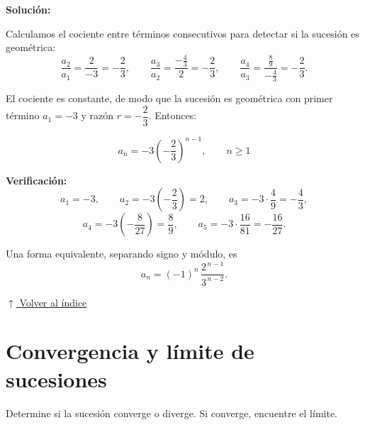 \documentclass[12pt]{article}
\newcommand{\solucion}{%
    \vspace{0.8em}%
    \textbf{Solución:}%
}
\newcommand{\volverindice}{%
    \vspace{1em}%
    \begin{flushright}%
        \hyperlink{indice}{\small $\uparrow$ Volver al índice}%
    \end{flushright}%
}
\begin{document}
\begin{enumerate}[label=\alph*.-]
    \solucion

    Calculamos el cociente entre términos consecutivos para detectar si la
    sucesión es geométrica:
    \[
    \frac{a_2}{a_1}=\frac{2}{-3}=-\frac23,
    \qquad
    \frac{a_3}{a_2}=\frac{-\frac43}{2}=-\frac23,
    \qquad
    \frac{a_4}{a_3}=\frac{\frac89}{-\frac43}=-\frac23 .
    \]

    El cociente es constante, de modo que la sucesión es geométrica con primer
    término $a_1=-3$ y razón $r=-\dfrac23$. Entonces:

    \[
    \boxed{
    a_n=-3\left(-\frac23\right)^{n-1},\qquad n\ge 1
    }
    \]

    \textbf{Verificación:}
    \[
    a_1=-3,
    \qquad
    a_2=-3\left(-\frac23\right)=2,
    \qquad
    a_3=-3\cdot\frac49=-\frac43,
    \]
    \[
    a_4=-3\left(-\frac{8}{27}\right)=\frac89,
    \qquad
    a_5=-3\cdot\frac{16}{81}=-\frac{16}{27}.
    \]

    Una forma equivalente, separando signo y módulo, es
    \[
    a_n=(-1)^{n}\,\frac{2^{\,n-1}}{3^{\,n-2}} .
    \]

\end{enumerate}

\volverindice
\newpage


\section{Convergencia y límite de sucesiones}

Determine si la sucesión converge o diverge. Si converge, encuentre el límite.
\end{document}
